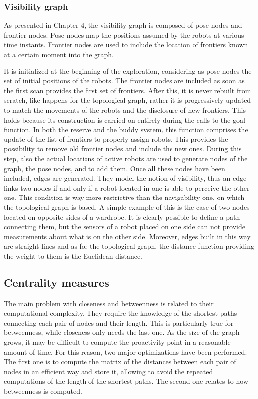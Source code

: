 \subsubsection{Visibility graph}

As presented in Chapter 4, the visibility graph is composed of pose
nodes and frontier nodes. Pose nodes map the positions assumed by
the robots at various time instants. Frontier nodes are used to include
the location of frontiers known at a certain moment into the graph.

It is initialized at the beginning of the exploration, considering
as pose nodes the set of initial positions of the robots. The frontier
nodes are included as soon as the first scan provides the first set
of frontiers. After this, it is never rebuilt from scratch, like happens
for the topological graph, rather it is progressively updated to match
the movements of the robots and the disclosure of new frontiers. This
holds because its construction is carried on entirely during the calls
to the goal function. In both the reserve and the buddy system, this
function comprises the update of the list of frontiers to properly
assign robots. This provides the possibility to remove old frontier
nodes and include the new ones. During this step, also the actual
locations of active robots are used to generate nodes of the graph,
the pose nodes, and to add them. Once all these nodes have been included,
edges are generated. They model the notion of visibility, thus an
edge links two nodes if and only if a robot located in one is able
to perceive the other one. This condition is way more restrictive
than the navigability one, on which the topological graph is based.
A simple example of this is the case of two nodes located on opposite
sides of a wardrobe. It is clearly possible to define a path connecting
them, but the sensors of a robot placed on one side can not provide
measurements about what is on the other side. Moreover, edges built
in this way are straight lines and as for the topological graph, the
distance function providing the weight to them is the Euclidean distance. 

\subsection{Centrality measures}

The main problem with closeness and betweenness is related to their
computational complexity. They require the knowledge of the shortest
paths connecting each pair of nodes and their length. This is particularly
true for betweenness, while closeness only needs the last one. As
the size of the graph grows, it may be difficult to compute the proactivity
point in a reasonable amount of time. For this reason, two major optimizations
have been performed. The first one is to compute the matrix of the
distances between each pair of nodes in an efficient way and store
it, allowing to avoid the repeated computations of the length of the
shortest paths. The second one relates to how betweenness is computed. 

